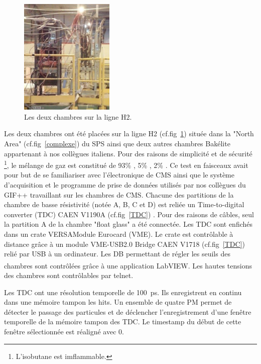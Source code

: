 \begin{figure}
	\centering
	\includegraphics[width=0.40\textwidth]{GLA/GCH2.png}
	\caption{Les deux chambres sur la ligne H2.}
	\label{GCH2}
\end{figure}
Les deux chambres ont été placées sur la ligne H2 (cf.fig~\ref{GCH2}) située dans la "North Area" (cf.fig~\ref{complexe}) du SPS ainsi que deux autres chambres Bakélite appartenant à nos collègues italiens. Pour des raisons de simplicité et de sécurité \footnote{L'isobutane est imflammable.}, le mélange de gaz est constitué de 93\% , 5\% , 2\% . Ce test en faisceaux avait pour but de se familiariser avec l'électronique de CMS ainsi que le système d'acquisition et le programme de prise de données utilisés par nos collègues du GIF++ travaillant sur les chambres de CMS. 
Chacune des partitions de la chambre de basse résistivité (notée A, B, C et D) est reliée un Time-to-digital converter (TDC) CAEN V1190A (cf.fig~\ref{TDC}) \cite{TDC}. Pour des raisons de câbles, seul la partition A de la chambre "float glass" a été connectée. Les TDC sont enfichés dans un crate VERSAModule Eurocard (VME). Le crate est contrôlable à distance grâce à un module VME-USB2.0 Bridge CAEN V1718 (cf.fig~\ref{TDC}) \cite{VME} relié par USB à un ordinateur. Les DB permettant de régler les seuils des chambres sont contrôlées grâce à une application LabVIEW\textsuperscript{\textregistered}. Les hautes tensions des chambres sont contrôlables par telnet. 

Les TDC ont une résolution temporelle de \SI{100}{\pico\second}. Ils enregistrent en continu dans une mémoire tampon les hits. Un ensemble de quatre PM permet de détecter le passage des particules et de déclencher l'enregistrement d'une fenêtre temporelle de la mémoire tampon des TDC. Le timestamp du début de cette fenêtre sélectionnée est réaligné avec $0$.

